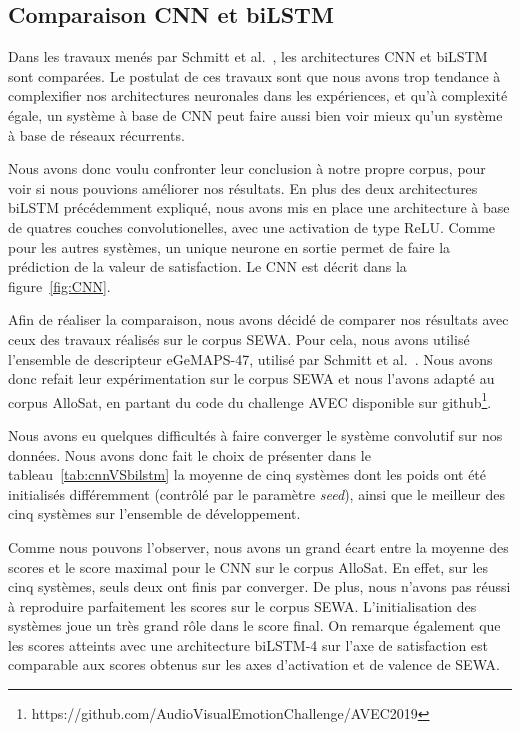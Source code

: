 \subsection{Comparaison CNN et biLSTM}
Dans les travaux menés par Schmitt et al.~\cite{Schmitt2019}, les architectures CNN et biLSTM sont comparées. Le postulat de ces travaux sont que nous avons trop tendance à complexifier nos architectures neuronales dans les expériences, et qu'à complexité égale, un système à base de CNN peut faire aussi bien voir mieux qu'un système à base de réseaux récurrents.

Nous avons donc voulu confronter leur conclusion à notre propre corpus, pour voir si nous pouvions améliorer nos résultats. En plus des deux architectures biLSTM précédemment expliqué, nous avons mis en place une architecture à base de quatres couches convolutionelles, avec une activation de type ReLU. Comme pour les autres systèmes, un unique neurone en sortie permet de faire la prédiction de la valeur de satisfaction. Le CNN est décrit dans la figure~\ref{fig:CNN}.



Afin de réaliser la comparaison, nous avons décidé de comparer nos résultats avec ceux des travaux réalisés sur le corpus SEWA. Pour cela, nous avons utilisé l'ensemble de descripteur eGeMAPS-47, utilisé par Schmitt et al.~\cite{Schmitt2019}. Nous avons donc refait leur expérimentation sur le corpus SEWA et nous l'avons adapté au corpus AlloSat, en partant du code du challenge AVEC disponible sur github\footnote{https://github.com/AudioVisualEmotionChallenge/AVEC2019}.

Nous avons eu quelques difficultés à faire converger le système convolutif sur nos données. Nous avons donc fait le choix de présenter dans le tableau~\ref{tab:cnnVSbilstm} la moyenne de cinq systèmes dont les poids ont été initialisés différemment (contrôlé par le paramètre \textit{seed}), ainsi que le meilleur des cinq systèmes sur l'ensemble de développement.



Comme nous pouvons l'observer, nous avons un grand écart entre la moyenne des scores et le score maximal pour le CNN sur le corpus AlloSat. En effet, sur les cinq systèmes, seuls deux ont finis par converger. De plus, nous n'avons pas réussi à reproduire parfaitement les scores sur le corpus SEWA. L'initialisation des systèmes joue un très grand rôle dans le score final. On remarque également que les scores atteints avec une architecture biLSTM-4 sur l'axe de satisfaction est comparable aux scores obtenus sur les axes d'activation et de valence de SEWA.

